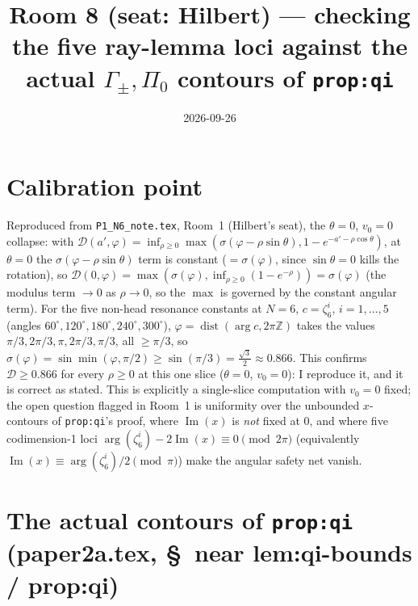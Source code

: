 \documentclass[11pt]{article}
\title{Room 8 (seat: Hilbert) --- checking the five ray-lemma loci against the actual
$\Gamma_\pm,\Pi_0$ contours of \texttt{prop:qi}}
\date{2026-09-26}
\begin{document}
\maketitle

\section*{Calibration point}

Reproduced from \texttt{P1\_N6\_note.tex}, Room~1 (Hilbert's seat), the $\theta=0$, $v_0=0$
collapse: with $\mathcal D(a',\varphi)=\inf_{\rho\ge0}\max(\sigma(\varphi-\rho\sin\theta),
1-e^{-a'-\rho\cos\theta})$, at $\theta=0$ the $\sigma(\varphi-\rho\sin\theta)$ term is constant
($=\sigma(\varphi)$, since $\sin\theta=0$ kills the rotation), so
$\mathcal D(0,\varphi)=\max(\sigma(\varphi),\inf_{\rho\ge0}(1-e^{-\rho}))=\sigma(\varphi)$
(the modulus term $\to0$ as $\rho\to0$, so the $\max$ is governed by the constant angular
term). For the five non-head resonance constants at $N=6$, $c=\zeta_6^i$, $i=1,\dots,5$
(angles $60^\circ,120^\circ,180^\circ,240^\circ,300^\circ$), $\varphi=\operatorname{dist}(\arg c,
2\pi\mathbb Z)$ takes the values $\pi/3,2\pi/3,\pi,2\pi/3,\pi/3$, all $\ge\pi/3$, so
$\sigma(\varphi)=\sin\min(\varphi,\pi/2)\ge\sin(\pi/3)=\tfrac{\sqrt3}2\approx0.866$. This
confirms $\mathcal D\ge0.866$ for every $\rho\ge0$ at this one slice ($\theta=0$, $v_0=0$): I
reproduce it, and it is correct as stated. This is explicitly a single-slice computation with
$v_0=0$ fixed; the open question flagged in Room~1 is uniformity over the unbounded $x$-contours
of \texttt{prop:qi}'s proof, where $\operatorname{Im}(x)$ is \emph{not} fixed at $0$, and where
five codimension-1 loci $\arg(\zeta_6^i)-2\operatorname{Im}(x)\equiv0\pmod{2\pi}$ (equivalently
$\operatorname{Im}(x)\equiv\arg(\zeta_6^i)/2\pmod\pi$) make the angular safety net vanish.

\section*{The actual contours of \texttt{prop:qi} (paper2a.tex, \S~near lem:qi-bounds / prop:qi)}
\end{document}
